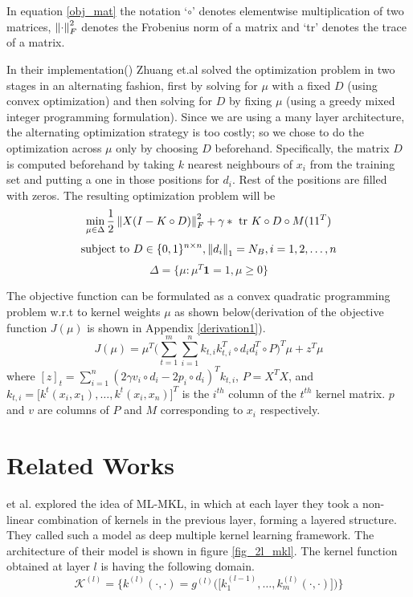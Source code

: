 In equation \ref{obj_mat} the notation `$\circ$' denotes elementwise multiplication of two matrices, $\left\lVert\cdot\right\rVert_F^2$ denotes the Frobenius norm of a matrix and `tr' denotes the trace of a matrix.

In their implementation(\cite{zhuang}) Zhuang et.al solved the optimization problem in two stages in an alternating fashion, first by solving for $\mu$ with a fixed $D$ (using convex optimization) and then solving for $D$ by fixing $\mu$ (using a greedy mixed integer programming formulation). Since we are using a many layer architecture, the alternating optimization strategy is too costly; so we chose to do the optimization across $\mu$ only by choosing $D$ beforehand. Specifically, the matrix $D$ is computed beforehand by taking $k$ nearest neighbours of $x_i$ from the training set and putting a one in those positions for $d_i$. Rest of the positions are filled with zeros. The resulting optimization problem will be  
\begin{equation}
  \begin{aligned}
  \min_{\mu \in \Delta} \frac{1}{2} \left\lVert X(I-K \circ D)\right\rVert_F^2 + \gamma* \textrm{ tr }K\circ D\circ M(11^T)
  \end{aligned}
\end{equation}
\[ \textrm{subject to } D \in \{0,1\}^{n \times n}, \left\lVert d_i\right\rVert_1 = N_B, i=1,2,\ldots,n \]
\[ \Delta = \Big\{\mu : \mu^T\textbf{1} = 1, \mu \geq 0 \Big\} \]

The objective function can be formulated as a convex quadratic programming problem w.r.t to kernel weights $\mu$ as shown below(derivation of the objective function $J(\mu)$ is shown in Appendix \ref{derivation1}).
\begin{equation}
J(\mu) = \mu^T \Bigg( \sum_{t=1}^m \sum_{i=1}^n k_{t,i}k_{t,i}^T \circ d_i d_i^T \circ P \Bigg)^T \mu + z^T \mu 
\end{equation}
where $[z]_t = \sum_{i=1}^n (2 \gamma v_i \circ d_i - 2 p_i \circ d_i)^T \mathit{k}_{t,i} $, $P = X^TX$, and $\mathit{k}_{t,i} = \Big[ k^t(x_i, x_1), \ldots, k^t(x_i, x_n) \Big]^T $ is the $i^{th}$ column of the $t^{th}$ kernel matrix. $p$ and $v$ are columns of $P$ and $M$ corresponding to $x_i$ respectively.

\section{Related Works}
\label{sec_rw}

\cite{2l_mkl} et al. explored the idea of ML-MKL, in which at each layer they took a non-linear combination of kernels in the previous layer, forming a layered structure. They called such a model as deep multiple kernel learning framework. The architecture of their model is shown in figure \ref{fig_2l_mkl}. The kernel function obtained at layer $l$ is having the following domain.
\[ \mathcal{K}^{(l)} = \bigg\{ k^{(l)}(\cdot, \cdot) = g^{(l)}\Big( \big[k_1^{(l-1)},\ldots, k_m^{(l)}(\cdot, \cdot) \big] \Big)  \bigg\} \]

